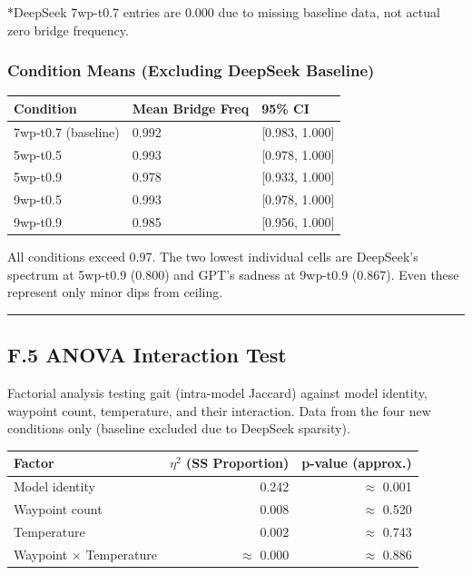 *DeepSeek 7wp-t0.7 entries are 0.000 due to missing baseline data, not actual zero bridge frequency.

\subsubsection{Condition Means (Excluding DeepSeek Baseline)}\label{condition-means-excluding-deepseek-baseline}

\begin{longtable}[]{@{}lll@{}}
\toprule\noalign{}
Condition & Mean Bridge Freq & 95\% CI \\
\midrule\noalign{}
\endhead
\bottomrule\noalign{}
\endlastfoot
7wp-t0.7 (baseline) & 0.992 & {[}0.983, 1.000{]} \\
5wp-t0.5 & 0.993 & {[}0.978, 1.000{]} \\
5wp-t0.9 & 0.978 & {[}0.933, 1.000{]} \\
9wp-t0.5 & 0.993 & {[}0.978, 1.000{]} \\
9wp-t0.9 & 0.985 & {[}0.956, 1.000{]} \\
\end{longtable}

All conditions exceed 0.97. The two lowest individual cells are DeepSeek's spectrum at 5wp-t0.9 (0.800) and GPT's sadness at 9wp-t0.9 (0.867). Even these represent only minor dips from ceiling.

\begin{center}\rule{0.5\linewidth}{0.5pt}\end{center}

\subsection{F.5 ANOVA Interaction Test}\label{f.5-anova-interaction-test}

Factorial analysis testing gait (intra-model Jaccard) against model identity, waypoint count, temperature, and their interaction. Data from the four new conditions only (baseline excluded due to DeepSeek sparsity).

\begin{longtable}[]{@{}lrr@{}}
\toprule\noalign{}
Factor & \(\eta^2\) (SS Proportion) & p-value (approx.) \\
\midrule\noalign{}
\endhead
\bottomrule\noalign{}
\endlastfoot
Model identity & 0.242 & \(\approx\) 0.001 \\
Waypoint count & 0.008 & \(\approx\) 0.520 \\
Temperature & 0.002 & \(\approx\) 0.743 \\
Waypoint \(\times\) Temperature & \(\approx\) 0.000 & \(\approx\) 0.886 \\
\end{longtable}


